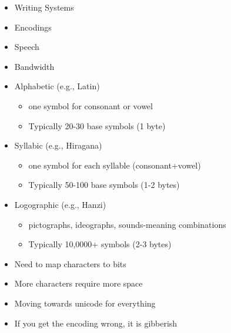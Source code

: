 \documentclass[a4paper,landscape,headrule,footrule,xetex]{foils}
\begin{document}


\maketitle

%




\begin{itemize}
\item Writing Systems
\item Encodings
\item Speech
\item Bandwidth
\end{itemize}

\begin{itemize}
\item Alphabetic (e.g., Latin)
  \begin{itemize}
  \item  one symbol for consonant or vowel
  \item Typically 20-30 base symbols (1 byte)
  \end{itemize}
\item Syllabic (e.g., Hiragana)
  \begin{itemize}
  \item  one symbol for each syllable (consonant+vowel)
  \item Typically 50-100 base symbols (1-2 bytes)
  \end{itemize}
\item Logographic (e.g., Hanzi)
  \begin{itemize}
  \item pictographs, ideographs, sounds-meaning combinations
  \item Typically 10,0000+ symbols (2-3 bytes)
  \end{itemize}


\end{itemize}

\begin{itemize}
\item Need to map characters to bits
\item More characters require more space
\item Moving towards unicode for everything
\item If you get the encoding wrong, it is gibberish
\end{itemize}
\end{document}
